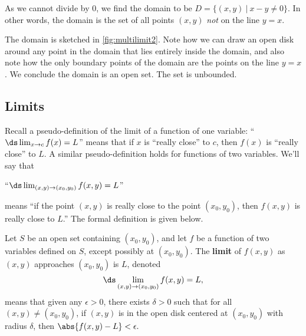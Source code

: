 {As we cannot divide by 0, we find the domain to be $D = \{(x,y)\ |\ x-y\neq 0\}$. In other words, the domain is the set of all points $(x,y)$ \emph{not} on the line $y=x$. 


The domain is sketched in \autoref{fig:multilimit2}. Note how we can draw an open disk around any point in the domain that lies entirely inside the domain, and also note how the only boundary points of the domain are the points on the line $y=x$. We conclude the domain is an open set. The set is unbounded.}

\subsection{Limits}

Recall a pseudo-definition of the limit of a function of one variable: ``$\ds \lim_{x\to c}f(x) = L$'' means that if $x$ is ``really close'' to $c$, then $f(x)$ is ``really close'' to $L$. A similar pseudo-definition holds for functions of two variables. We'll say that 

\begin{center}
``$\ds \lim_{(x,y)\to (x_0,y_0)} f(x,y) = L$''
\end{center}
means ``if the point $(x,y)$ is really close to the point $(x_0,y_0)$, then $f(x,y)$ is really close to $L$.'' The formal definition is given below.

{Let $S$ be an open set containing $(x_0,y_0)$, and let $f$ be a function of two variables defined on $S$, except possibly at $(x_0,y_0)$. 
The \textbf{limit} of $f(x,y)$ as $(x,y)$ approaches $(x_0,y_0)$ is $L$, denoted
\[\ds \lim_{(x,y)\to (x_0,y_0)} f(x,y) = L,\]
means that given any $\epsilon>0$, there exists $\delta>0$ such that for all  $(x,y)\neq (x_0,y_0)$, if $(x,y)$ is in the open disk centered at $(x_0,y_0)$ with radius $\delta$, then $\abs{f(x,y)-L}<\epsilon.$
}

